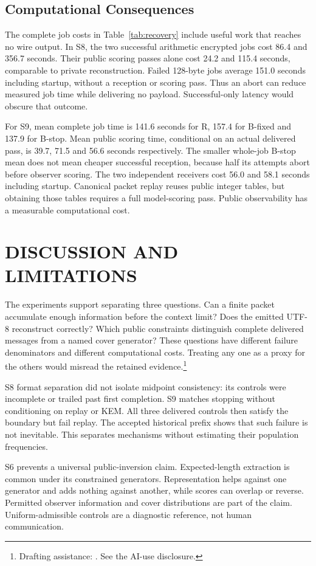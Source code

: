 \documentclass[a4paper,twoside]{article}
\newcommand{\aidraft}{\footnote{Drafting assistance: \cite{openai2026codex}. See the AI-use disclosure.}}
\begin{document}
\subsection{Computational Consequences}
\noindent The complete job costs in Table~\ref{tab:recovery} include useful work that reaches no wire output. In S8, the two successful arithmetic encrypted jobs cost 86.4 and 356.7 seconds. Their public scoring passes alone cost 24.2 and 115.4 seconds, comparable to private reconstruction. Failed 128-byte jobs average 151.0 seconds including startup, without a reception or scoring pass. Thus an abort can reduce measured job time while delivering no payload. Successful-only latency would obscure that outcome.

For S9, mean complete job time is 141.6 seconds for R, 157.4 for B-fixed and 137.9 for B-stop. Mean public scoring time, conditional on an actual delivered pass, is 39.7, 71.5 and 56.6 seconds respectively. The smaller whole-job B-stop mean does not mean cheaper successful reception, because half its attempts abort before observer scoring. The two independent receivers cost 56.0 and 58.1 seconds including startup. Canonical packet replay reuses public integer tables, but obtaining those tables requires a full model-scoring pass. Public observability has a measurable computational cost.

\section{DISCUSSION AND LIMITATIONS}
\label{sec:discussion}
\noindent The experiments support separating three questions. Can a finite packet accumulate enough information before the context limit? Does the emitted UTF-8 reconstruct correctly? Which public constraints distinguish complete delivered messages from a named cover generator? These questions have different failure denominators and different computational costs. Treating any one as a proxy for the others would misread the retained evidence.\aidraft

S8 format separation did not isolate midpoint consistency: its controls were incomplete or trailed past first completion. S9 matches stopping without conditioning on replay or KEM. All three delivered controls then satisfy the boundary but fail replay. The accepted historical prefix shows that such failure is not inevitable. This separates mechanisms without estimating their population frequencies.

S6 prevents a universal public-inversion claim. Expected-length extraction is common under its constrained generators. Representation helps against one generator and adds nothing against another, while scores can overlap or reverse. Permitted observer information and cover distributions are part of the claim. Uniform-admissible controls are a diagnostic reference, not human communication.
\end{document}
